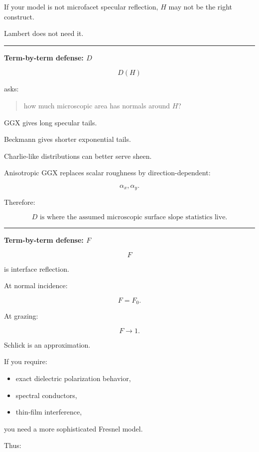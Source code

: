 If your model is not microfacet specular reflection, \(H\) may not be the right construct.

Lambert does not need it.

\begin{center}\rule{0.5\linewidth}{0.5pt}\end{center}

\textbf{Term-by-term defense: \(D\)}

\[
D(H)
\]

asks:

\begin{quote}
how much microscopic area has normals around \(H\)?
\end{quote}

GGX gives long specular tails.

Beckmann gives shorter exponential tails.

Charlie-like distributions can better serve sheen.

Anisotropic GGX replaces scalar roughness by direction-dependent:

\[
\alpha_x,\alpha_y.
\]

Therefore:

\[
\boxed{
D\text{ is where the assumed microscopic surface slope statistics live.}
}
\]

\begin{center}\rule{0.5\linewidth}{0.5pt}\end{center}

\textbf{Term-by-term defense: \(F\)}

\[
F
\]

is interface reflection.

At normal incidence:

\[
F=F_0.
\]

At grazing:

\[
F\rightarrow1.
\]

Schlick is an approximation.

If you require:

\begin{itemize}
\tightlist
\item
  exact dielectric polarization behavior,
\item
  spectral conductors,
\item
  thin-film interference,
\end{itemize}

you need a more sophisticated Fresnel model.

Thus:

